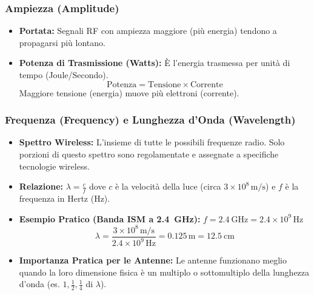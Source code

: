 \documentclass{article}
\begin{document}
\subsubsection{Ampiezza (Amplitude)}
\begin{itemize}
    \item \textbf{Portata:} Segnali RF con ampiezza maggiore (più energia) tendono a propagarsi più lontano.
    \item \textbf{Potenza di Trasmissione (Watts):} È l'energia trasmessa per unità di tempo (Joule/Secondo).
    \[ \text{Potenza} = \text{Tensione} \times \text{Corrente} \]
    Maggiore tensione (energia) muove più elettroni (corrente).
\end{itemize}

\subsubsection{Frequenza (Frequency) e Lunghezza d'Onda (Wavelength)}
\begin{itemize}
    \item \textbf{Spettro Wireless:} L'insieme di tutte le possibili frequenze radio. Solo porzioni di questo spettro sono regolamentate e assegnate a specifiche tecnologie wireless.
    \item \textbf{Relazione:} $\lambda = \frac{c}{f}$
    dove $c$ è la velocità della luce (circa $3 \times 10^8 \, \text{m/s}$) e $f$ è la frequenza in Hertz (Hz).
    \item \textbf{Esempio Pratico (Banda ISM a \SI{2.4}{\giga\hertz}):}
    $f = \SI{2.4}{\giga\hertz} = 2.4 \times 10^9 \, \text{Hz}$
    \[ \lambda = \frac{3 \times 10^8 \, \text{m/s}}{2.4 \times 10^9 \, \text{Hz}} = 0.125 \, \text{m} = \SI{12.5}{\centi\meter} \]
    \item \textbf{Importanza Pratica per le Antenne:} Le antenne funzionano meglio quando la loro dimensione fisica è un multiplo o sottomultiplo della lunghezza d'onda (es. $1, \frac{1}{2}, \frac{1}{4}$ di $\lambda$).
\end{itemize}
\begin{center}
\end{center}
\end{document}

